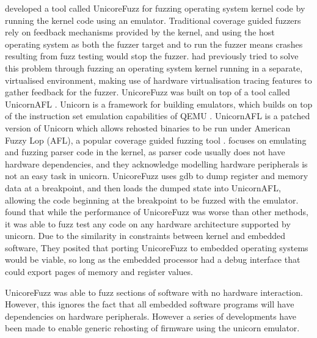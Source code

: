 \documentclass[../report.tex]{subfiles}
\begin{document}
\citet{Maier_2019} developed a tool called UnicoreFuzz for fuzzing operating
system kernel code by running the kernel code using an emulator. Traditional
coverage guided fuzzers rely on feedback mechanisms provided by the kernel, and
using the host operating system as both the fuzzer target and to run the fuzzer
means crashes resulting from fuzz testing would stop the fuzzer.
\citet{kAFL_2017} had previously tried to solve this problem through fuzzing an
operating system kernel running in a separate, virtualised environment, making
use of hardware virtualisation tracing features to gather feedback for the
fuzzer. UnicoreFuzz was built on top of a tool called UnicornAFL
\citep{Maier_2019}. Unicorn is a framework for building emulators, which builds
on top of the instruction set emulation capabilities of QEMU \citep{Unicorn}.
UnicornAFL is a patched version of Unicorn which allows rehosted binaries to be
run under American Fuzzy Lop (AFL), a popular coverage guided fuzzing tool
\citep{UnicornMode, AFL_2019}.
\citet{Maier_2019} focuses on emulating and fuzzing parser code in the kernel,
as parser code usually does not have hardware dependencies, and they
acknowledge modelling hardware peripherals is not an easy task in unicorn.
UnicoreFuzz uses gdb to dump register and memory data at a breakpoint, and then
loads the dumped state into UnicornAFL, allowing the code beginning at the
breakpoint to be fuzzed with the emulator. \citet{Maier_2019} found that while
the performance of UnicoreFuzz was worse than other methods, it was able to
fuzz test any code on any hardware architecture supported by unicorn. Due to
the similarity in constraints between kernel and embedded software, They
posited that porting UnicoreFuzz to embedded operating systems would be viable,
so long as the embedded processor had a debug interface that could export pages
of memory and register values.

UnicoreFuzz was able to fuzz sections of software with no hardware interaction.
However, this ignores the fact that all embedded software programs will have
dependencies on hardware peripherals. However a series of developments have
been made to enable generic rehosting of firmware using the unicorn emulator.
\end{document}
